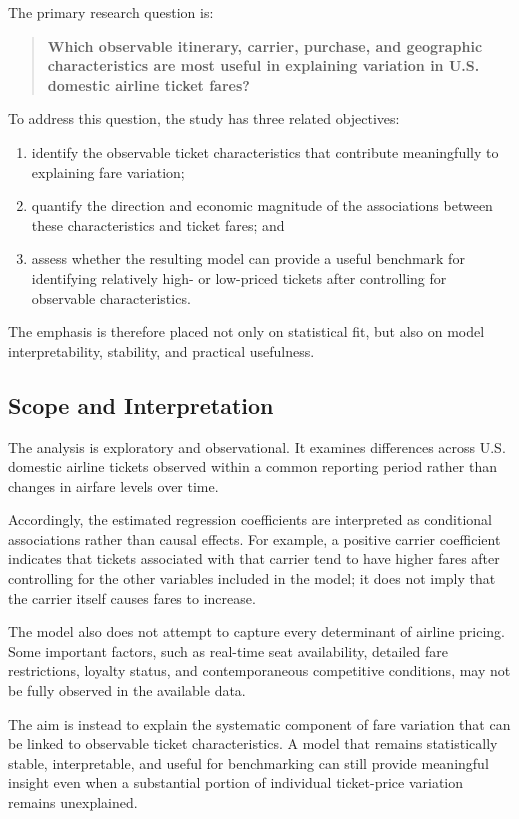 \documentclass[11pt,a4paper]{article}
\begin{document}
The primary research question is:

\begin{quote}
\textbf{Which observable itinerary, carrier, purchase, and geographic characteristics are most useful in explaining variation in U.S. domestic airline ticket fares?}
\end{quote}

To address this question, the study has three related objectives:

\begin{enumerate}
    \item identify the observable ticket characteristics that contribute meaningfully to explaining fare variation;
    \item quantify the direction and economic magnitude of the associations between these characteristics and ticket fares; and
    \item assess whether the resulting model can provide a useful benchmark for identifying relatively high- or low-priced tickets after controlling for observable characteristics.
\end{enumerate}

The emphasis is therefore placed not only on statistical fit, but also on model interpretability, stability, and practical usefulness.

\subsection{Scope and Interpretation}

The analysis is exploratory and observational. It examines differences across U.S. domestic airline tickets observed within a common reporting period rather than changes in airfare levels over time.

Accordingly, the estimated regression coefficients are interpreted as conditional associations rather than causal effects. For example, a positive carrier coefficient indicates that tickets associated with that carrier tend to have higher fares after controlling for the other variables included in the model; it does not imply that the carrier itself causes fares to increase.

The model also does not attempt to capture every determinant of airline pricing. Some important factors, such as real-time seat availability, detailed fare restrictions, loyalty status, and contemporaneous competitive conditions, may not be fully observed in the available data.

The aim is instead to explain the systematic component of fare variation that can be linked to observable ticket characteristics. A model that remains statistically stable, interpretable, and useful for benchmarking can still provide meaningful insight even when a substantial portion of individual ticket-price variation remains unexplained.
\end{document}
